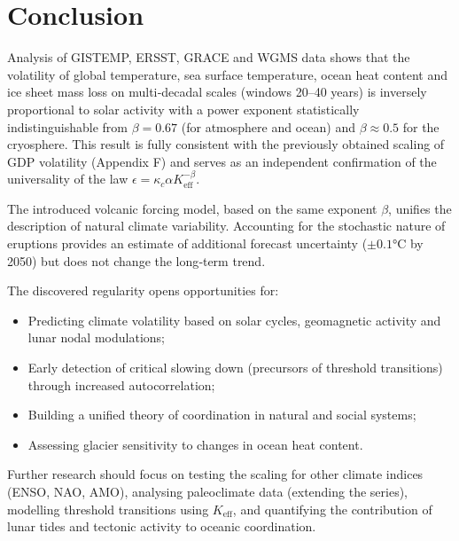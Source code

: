 \documentclass[12pt,a4paper]{article}
\newcommand{\Keff}{K_{\mathrm{eff}}}
\newcommand{\kappac}{\kappa_c}
\newcommand{\be}{\beta}
\begin{document}
	\section{Conclusion}
	
	Analysis of GISTEMP, ERSST, GRACE and WGMS data shows that the volatility of global temperature, sea surface temperature, ocean heat content and ice sheet mass loss on multi‑decadal scales (windows 20–40 years) is inversely proportional to solar activity with a power exponent statistically indistinguishable from \(\be = 0.67\) (for atmosphere and ocean) and \(\be \approx 0.5\) for the cryosphere. This result is fully consistent with the previously obtained scaling of GDP volatility (Appendix F) and serves as an independent confirmation of the universality of the law \(\epsilon = \kappac \alpha \Keff^{-\be}\).
	
	The introduced volcanic forcing model, based on the same exponent \(\beta\), unifies the description of natural climate variability. Accounting for the stochastic nature of eruptions provides an estimate of additional forecast uncertainty (\(\pm0.1\)°C by 2050) but does not change the long‑term trend.
	
	The discovered regularity opens opportunities for:
	\begin{itemize}
		\item Predicting climate volatility based on solar cycles, geomagnetic activity and lunar nodal modulations;
		\item Early detection of critical slowing down (precursors of threshold transitions) through increased autocorrelation;
		\item Building a unified theory of coordination in natural and social systems;
		\item Assessing glacier sensitivity to changes in ocean heat content.
	\end{itemize}
	
	Further research should focus on testing the scaling for other climate indices (ENSO, NAO, AMO), analysing paleoclimate data (extending the series), modelling threshold transitions using \(\Keff\), and quantifying the contribution of lunar tides and tectonic activity to oceanic coordination.
	
\end{document}
